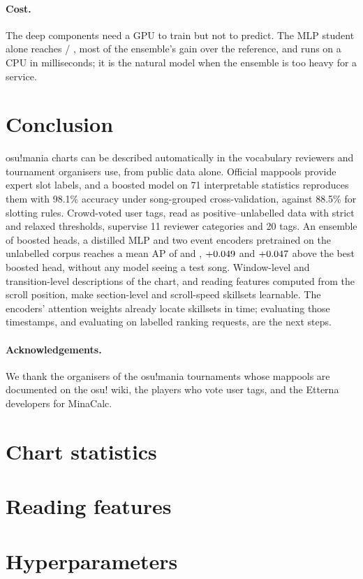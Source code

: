 \documentclass[10pt,twocolumn]{article}
\begin{document}
\paragraph{Cost.} The deep components need a GPU to train but not to predict. The MLP student alone reaches \catMlp{} / \tagMlp{}, most of the ensemble's gain over the reference, and runs on a CPU in milliseconds; it is the natural model when the ensemble is too heavy for a service.

\section{Conclusion}
osu!mania charts can be described automatically in the vocabulary reviewers and tournament organisers use, from public data alone. Official mappools provide expert slot labels, and a boosted model on 71 interpretable statistics reproduces them with 98.1\% accuracy under song-grouped cross-validation, against 88.5\% for slotting rules. Crowd-voted user tags, read as positive--unlabelled data with strict and relaxed thresholds, supervise 11 reviewer categories and 20 tags. An ensemble of boosted heads, a distilled MLP and two event encoders pretrained on the unlabelled corpus reaches a mean AP of \catEns{} and \tagEns{}, $+0.049$ and $+0.047$ above the best boosted head, without any model seeing a test song. Window-level and transition-level descriptions of the chart, and reading features computed from the scroll position, make section-level and scroll-speed skillsets learnable. The encoders' attention weights already locate skillsets in time; evaluating those timestamps, and evaluating on labelled ranking requests, are the next steps.

\paragraph{Acknowledgements.} We thank the organisers of the osu!mania tournaments whose mappools are documented on the osu! wiki, the players who vote user tags, and the Etterna developers for MinaCalc.




\clearpage
\onecolumn
\appendix
\section{Chart statistics}\label{app:features}


\section{Reading features}\label{app:reading}


\section{Hyperparameters}\label{app:hparams}

\end{document}
